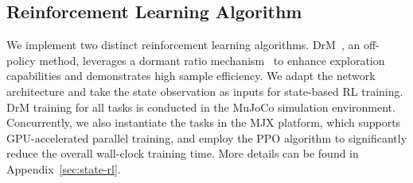 \subsection{Reinforcement Learning Algorithm}
We implement two distinct reinforcement learning algorithms. DrM~\cite{xudrm}, an off-policy method, leverages a dormant ratio mechanism~\cite{sokar2023dormant} to enhance exploration capabilities and demonstrates high sample efficiency. We adapt the network architecture and take the state observation as inputs for state-based RL training. DrM training for all tasks is conducted in the MuJoCo simulation environment. Concurrently, we also instantiate the tasks in the MJX platform, which supports GPU-accelerated parallel training, and employ the PPO algorithm to significantly reduce the overall wall-clock training time. More details can be found in Appendix~\ref{sec:state-rl}. 




